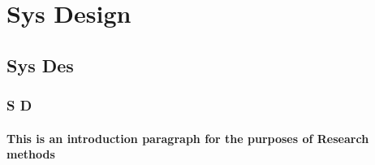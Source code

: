 \section{Sys Design}
\subsection{Sys Des}
\subsubsection{S D}
\paragraph{This is an introduction paragraph for the purposes of Research methods}